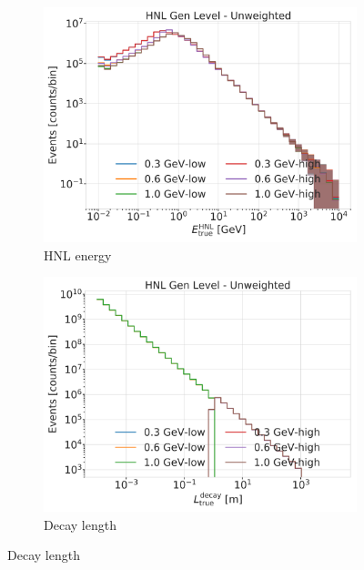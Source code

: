 
\begin{figure}[h]
    \centering
    \begin{subfigure}{0.49\linewidth}
        \includegraphics{figures/hnl_simulation/generation/1_d_distr_HNL_true_energy_gen_level_unweighted.png}
        \caption{HNL energy}
    \end{subfigure}
    \begin{subfigure}{0.49\linewidth}
        \includegraphics{figures/hnl_simulation/generation/1_d_distr_distance_gen_level_unweighted.png}
        \caption{Decay length}
    \end{subfigure}

\end{figure}

